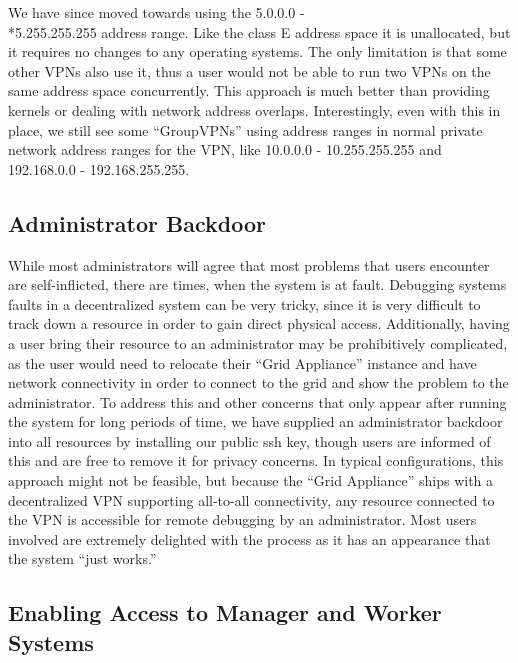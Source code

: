 \documentclass[twocolumn]{svjour3}
\begin{document}
We have since moved towards using the 5.0.0.0 - \\*5.255.255.255 address range.
Like the class E address space it is unallocated, but it requires no changes to
any operating systems.  The only limitation is that some other VPNs also use
it, thus a user would not be able to run two VPNs on the same address space
concurrently.  This approach is much better than providing kernels or dealing
with network address overlaps.  Interestingly, even with this in place, we
still see some ``GroupVPNs''  using address ranges in normal private network
address ranges for the VPN, like 10.0.0.0 - 10.255.255.255 and 192.168.0.0 -
192.168.255.255.

\subsection{Administrator Backdoor}

While most administrators will agree that most problems that users encounter
are self-inflicted, there are times, when the system is at fault.  Debugging
systems faults in a decentralized system can be very tricky, since it is very
difficult to track down a resource in order to gain direct physical access.
Additionally, having a user bring their resource to an administrator may be
prohibitively complicated, as the user would need to relocate their ``Grid
Appliance'' instance and have network connectivity in order to connect to the
grid and show the problem to the administrator.  To address this and other
concerns that only appear after running the system for long periods of time, we
have supplied an administrator backdoor into all resources by installing our
public ssh key, though users are informed of this and are free to remove it for
privacy concerns.  In typical configurations, this approach might not be
feasible, but because the ``Grid Appliance'' ships with a decentralized VPN
supporting all-to-all connectivity, any resource connected to the VPN is
accessible for remote debugging by an administrator.  Most users involved are
extremely delighted with the process as it has an appearance that the system
``just works.''

\subsection{Enabling Access to Manager and Worker Systems}
 
\end{document}

